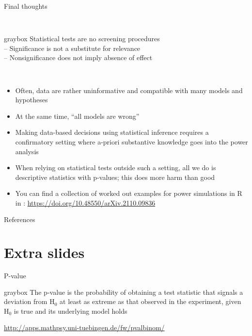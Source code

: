 \documentclass[aspectratio=169]{beamer}
\newenvironment{colbox}[1][\textwidth]%
  {\begin{beamercolorbox}[wd=#1, rounded=true, shadow=true]{graybox}}
  {\end{beamercolorbox}}
\begin{document}
\begin{frame}{Final thoughts}

~\hfill\begin{colbox}[10cm]
Statistical tests are no screening procedures\\[1ex]
-- Significance is not a substitute for relevance\\
-- Nonsignificance does not imply absence of effect
\end{colbox}\hfill~

\vspace{2ex}

\begin{itemize}
\item Often, data are rather uninformative and compatible with many models and
hypotheses\\[1ex]

\item At the same time, ``all models are wrong'' \citep{Box76}\\[1ex]

\item Making data-based decisions using statistical inference requires a
confirmatory setting where a-priori substantive knowledge goes into the power
analysis\\[1ex]

\item When relying on statistical tests outside such a setting, all we do is
descriptive statistics with p-values; this does more harm than good

\item You can find a collection of worked out examples for power simulations in
  R in \citet{Wickelmaier22}: \url{https://doi.org/10.48550/arXiv.2110.09836}

\end{itemize}

\end{frame}


\appendix
\begin{frame}[allowframebreaks]{References}
\renewcommand{\bibfont}{\small}


\end{frame}


\section*{Extra slides}


\begin{frame}{P-value}

\begin{colbox}
The p-value is the probability of obtaining a test statistic that signals a
deviation from H$_0$ at least as extreme as that observed in the experiment,
given H$_0$ is true and its underlying model holds
\end{colbox}

\vspace{2ex}
\url{http://apps.mathpsy.uni-tuebingen.de/fw/pvalbinom/}

\end{frame}
\end{document}
